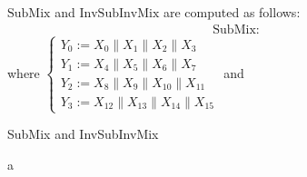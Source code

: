 $\text{SubMix}$ and $\text{InvSubInvMix}$ are computed as follows: \begin{align*}
	\text{SubMix}:
\end{align*}
where $\begin{cases}
	Y_0:=X_0\parallel X_1\parallel X_2\parallel X_3\\
	Y_1:=X_4\parallel X_5\parallel X_6\parallel X_7\\
	Y_2:=X_8\parallel X_9\parallel X_{10}\parallel X_{11}\\
	Y_3:=X_{12}\parallel X_{13}\parallel X_{14}\parallel X_{15}
\end{cases}$ and

\begin{algorithm}[H]
	\caption{SubMix and InvSubInvMix}
	\BlankLine
	\begin{multicols}{2}
		\BlankLine
		\columnbreak %
		\setcounter{AlgoLine}{0}  %
		\BlankLine
		a
	\end{multicols}
	\BlankLine
\end{algorithm}




